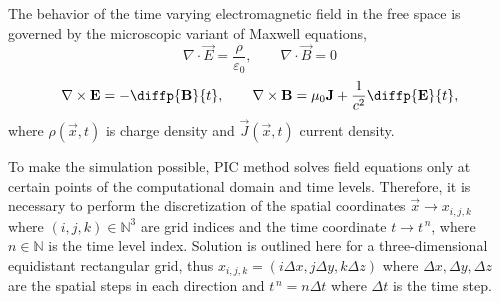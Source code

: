 The behavior of the time varying electromagnetic field in the free space is governed by the microscopic variant of Maxwell equations,
\begin{equation}
\label{3.1.1.1}
\nabla \cdot \vec{E} = \frac{\rho}{\varepsilon_{0}}, \qquad \nabla \cdot \vec{B} = 0
\end{equation}
\begin{equation}
\label{3.1.1.2}
\nabla \times \vec{E} = - \diffp{\vec{B}}{t}, \qquad \nabla \times \vec{B} = \mu_{0} \vec{J} + \frac{1}{c^{2}} \diffp{\vec{E}}{t},
\end{equation}
where $ \rho\left(\vec{x}, t \right) $ is charge density and $ \vec{J}\left(\vec{x}, t \right) $ current density.

To make the simulation possible, PIC method solves field equations only at certain points of the computational domain and time levels. Therefore, it is necessary to perform the discretization of the spatial coordinates $ \vec{x} \rightarrow x_{i, j, k} $ where $ (i,j,k) \in \mathbb{N}^{3} $ are grid indices and the time coordinate $ t \rightarrow t^{\,n} $, where $ n \in \mathbb{N} $ is the time level index. Solution is outlined here for a three-dimensional equidistant rectangular grid, thus $ x_{i, j, k} = \left(i \Delta x, j \Delta y, k \Delta z\right) $ where $ \Delta x, \Delta y, \Delta z $ are the spatial steps in each direction and $ t^{\,n} = n\Delta t $ where $ \Delta t $ is the time step.

